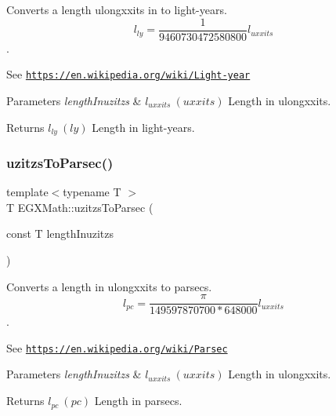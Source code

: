 Converts a length ulongxxits in to light-\/years. \[ l_{ly}= \frac{1}{9460730472580800} l_{uxxits} \]. 

See \href{https://en.wikipedia.org/wiki/Light-year}{\tt https\+://en.\+wikipedia.\+org/wiki/\+Light-\/year} 
\begin{DoxyParams}{Parameters}
{\em length\+Inuzitzs} & $ l_{uxxits}\ (uxxits)$ Length in ulongxxits. \\
\hline
\end{DoxyParams}
\begin{DoxyReturn}{Returns}
$ l_{ly}\ (ly)$ Length in light-\/years. 
\end{DoxyReturn}
\mbox{\label{group___e_g_x_math-_conversions-_length_conversions-uzitzs-_astronomical_ga028a17a589e3f3d0c09daa6fbe664989}} 
\subsubsection{\texorpdfstring{uzitzs\+To\+Parsec()}{uzitzsToParsec()}}
{\footnotesize\ttfamily template$<$typename T $>$ \\
T E\+G\+X\+Math\+::uzitzs\+To\+Parsec (\begin{DoxyParamCaption}\item[{const T}]{length\+Inuzitzs }\end{DoxyParamCaption})}



Converts a length in ulongxxits to parsecs. \[ l_{pc}=\frac{\pi}{149597870700 * 648000} l_{uxxits} \]. 

See \href{https://en.wikipedia.org/wiki/Parsec}{\tt https\+://en.\+wikipedia.\+org/wiki/\+Parsec} 
\begin{DoxyParams}{Parameters}
{\em length\+Inuzitzs} & $ l_{uxxits}\ (uxxits)$ Length in ulongxxits. \\
\hline
\end{DoxyParams}
\begin{DoxyReturn}{Returns}
$ l_{pc}\ (pc)$ Length in parsecs. 
\end{DoxyReturn}
